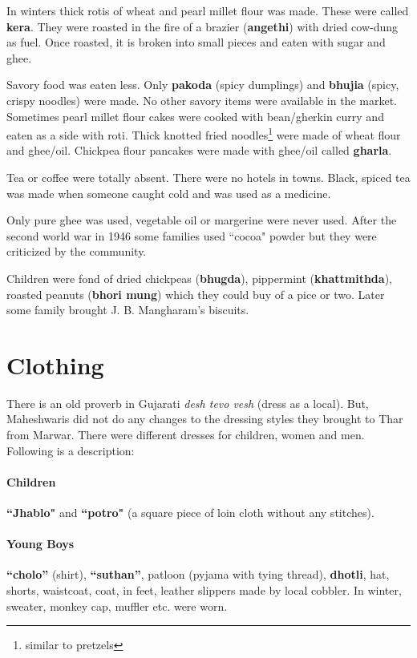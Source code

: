 In winters thick rotis of wheat and pearl millet flour was made. These were
called \textbf{kera}. They were roasted in the fire of a brazier
(\textbf{angethi}) with dried cow-dung as fuel. Once roasted, it is broken into
small pieces and eaten with sugar and ghee.

Savory food was eaten less. Only \textbf{pakoda} (spicy dumplings) and
\textbf{bhujia} (spicy, crispy noodles) were made. No other savory items were
available in the market. Sometimes pearl millet flour cakes were cooked with
bean/gherkin curry and eaten as a side with roti. Thick knotted fried
noodles\footnote{similar to pretzels} were made of wheat flour and ghee/oil.
Chickpea flour pancakes were made with ghee/oil called \textbf{gharla}.

Tea or coffee were totally absent. There were no hotels in towns. Black, spiced
tea was made when someone caught cold and was used as a medicine.

Only pure ghee was used, vegetable oil or margerine were never used. After the
second world war in 1946 some families used ``cocoa" powder but they were
criticized by the community. 

Children were fond of dried chickpeas (\textbf{bhugda}), pippermint
(\textbf{khattmithda}), roasted peanuts (\textbf{bhori mung}) which they could
buy of a pice or two. Later some family brought J. B. Mangharam's biscuits.

\section{Clothing}
There is an old proverb in Gujarati \textit{desh tevo vesh} (dress as a local).
But, Maheshwaris did not do any changes to the dressing styles they brought to
Thar from Marwar. There were different dresses for children, women and men.
Following is a description:

\paragraph{Children} \textbf{``Jhablo"} and \textbf{``potro"} (a square piece of loin cloth without any stitches).

\paragraph{Young Boys} \textbf{``cholo''} (shirt), \textbf{``suthan''}, patloon
(pyjama with tying thread), \textbf{dhotli}, hat, shorts, waistcoat,
coat, in feet, leather slippers made by local cobbler. In winter, sweater,
monkey cap, muffler etc. were worn.
